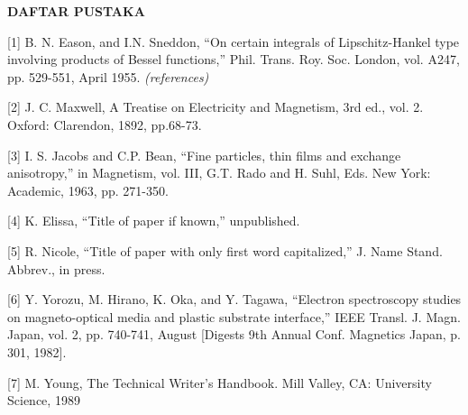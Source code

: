\begin{spacing}{1.5}
\begin{center}
\textbf{\large DAFTAR PUSTAKA}
\end{center}

[1]	B. N. Eason, and I.N. Sneddon, “On certain integrals of Lipschitz-Hankel type involving products of \indent \indent Bessel functions,” Phil. Trans. Roy. Soc. London, vol. A247, pp. 529-551, April 1955. \textit{(references)}

\medskip

[2]	J. C. Maxwell, A Treatise on Electricity and Magnetism, 3rd ed., vol. 2. Oxford: Clarendon, 1892, \indent \indent pp.68-73.

\medskip

[3]	I. S. Jacobs and C.P. Bean, “Fine particles, thin films and exchange anisotropy,” in Magnetism, vol. \indent \indent III, G.T. Rado and H. Suhl, Eds. New York: Academic, 1963, pp. 271-350.

\medskip

[4]	K. Elissa, “Title of paper if known,” unpublished.

\medskip

[5]	R. Nicole, “Title of paper with only first word capitalized,” J. Name Stand. Abbrev., in press.

\medskip

[6]	Y. Yorozu, M. Hirano, K. Oka, and Y. Tagawa, “Electron spectroscopy studies on magneto-optical \indent \indent media and plastic substrate interface,” IEEE Transl. J. Magn. Japan, vol. 2, pp. 740-741, August \indent {} [Digests 9th Annual Conf. Magnetics Japan, p. 301, 1982].

\medskip

[7]	M. Young, The Technical Writer’s Handbook. Mill Valley, CA: University Science, 1989

\medskip

\end{spacing}